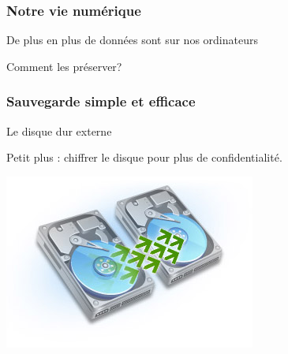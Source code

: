 \documentclass{beamer}
\begin{document}
\begin{frame}
\frametitle{Notre vie numérique}

\begin{block}{De plus en plus de données sont sur nos ordinateurs}
\begin{itemize}
\end{itemize}
Comment les préserver?
\end{block}
\end{frame}


\begin{frame}
\frametitle{Sauvegarde simple et efficace}

\begin{block}{Le disque dur externe}
\begin{itemize}
\end{itemize}
Petit plus : chiffrer le disque pour plus de confidentialité.
\end{block}
\begin{center}
\includegraphics[scale=0.5] {./images/backup.jpg}
\end{center}

\end{frame}
\end{document}
